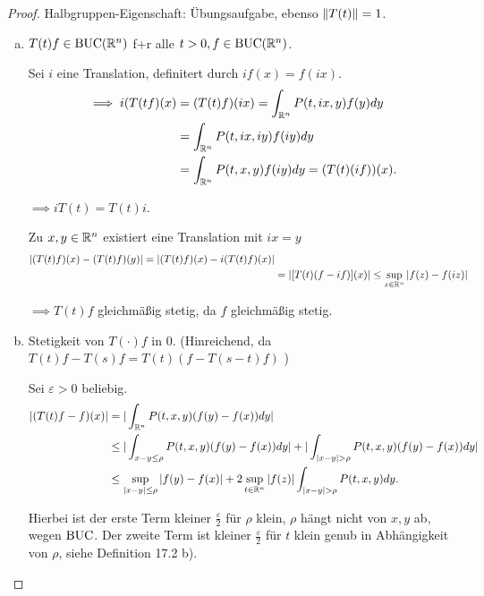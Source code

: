 \begin{proof}
  Halbgruppen-Eigenschaft: Übungsaufgabe, ebenso $\lVert T(t) \rVert = 1$.
  \begin{enumerate}[a)]
    \item $T(t)f \in \operatorname{BUC}(\mathbb{R}^n)$ f+r alle $t > 0, f \in \operatorname{BUC}(\mathbb{R}^n)$.
      
      Sei $i$ eine Translation, definitert durch $if(x) = f(ix)$.
      \begin{align*}
        \implies i(T(tf)(x) &= (T(t)f) (ix) = \int_{\mathbb{R}^n} P(t,ix,y)f(y) dy \\
        &= \int_{\mathbb{R}^n} P(t,ix,iy) f(iy) dy \\
        &= \int_{\mathbb{R}^n} P(t,x,y) f(iy) dy = (T(t)(if))(x).
      \end{align*}

      $\implies iT(t) = T(t)i$.

      Zu $x,y \in \mathbb{R}^n$ existiert eine Translation mit $ix = y$
      \begin{align*}
        |(T(t)f)(x) -  (T(t)f)(y)| = |(T(t)f)(x) - i(T(t)f)(x)| \\
        &= |[T(t)(f - if)](x)| \leq \sup_{z \in \mathbb{R}^n} |f(z) - f(iz)|
      \end{align*}

      $\implies T(t)f$ gleichmäßig stetig, da $f$ gleichmäßig stetig.

    \item Stetigkeit von $T(\cdot)f$ in $0$. (Hinreichend, da $T(t)f- T(s)f = T(t)(f - T(s - t)f)$ )

      Sei $\varepsilon > 0$ beliebig.
      \begin{align*}
        |(T(t) f - f)(x)| &= | \int_{\mathbb{R}^n} P(t,x,y)(f(y) - f(x)) dy | \\
        &\leq |\int_{x - y \leq \rho} P(t,x,y) (f(y) - f(x)) dy | + | \int_{|x - y| > \rho} P(t,x,y) (f(y) - f(x)) dy | \\
        &\leq \sup_{|x - y| \leq \rho} |f(y) - f(x)| + 2 \sup_{t \in\mathbb{R}^n} |f(z)| \int_{|x - y| > \rho} P(t,x,y) dy.
      \end{align*}

      Hierbei ist der erste Term kleiner $\frac{\varepsilon}{2}$ für $\rho$ klein, $\rho$ hängt nicht von $x,y$ ab, wegen $\operatorname{BUC}$.
      Der zweite Term ist kleiner $\frac{\varepsilon}{2}$ für $t$ klein genub in Abhängigkeit von $\rho$, siehe Definition 17.2 b).
  \end{enumerate}
\end{proof}

